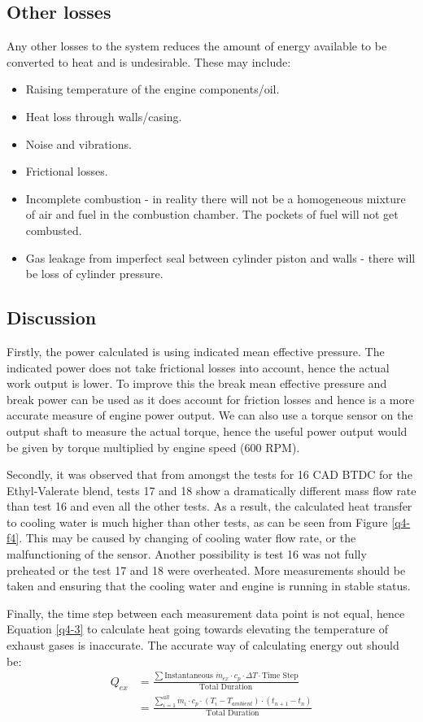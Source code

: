 \documentclass[11pt]{article}
\begin{document}
\subsection*{Other losses}
Any other losses to the system reduces the amount of energy available to be converted to heat and is undesirable. These may include:
\begin{itemize}
	\item Raising temperature of the engine components/oil.
	\item Heat loss through walls/casing.
	\item Noise and vibrations.
	\item Frictional losses. 
	\item Incomplete combustion - in reality there will not be a homogeneous mixture of air and fuel in the combustion chamber. The pockets of fuel will not get combusted.
	\item Gas leakage from imperfect seal between cylinder piston and walls - there will be loss of cylinder pressure.
\end{itemize}
\subsection*{Discussion}
Firstly, the power calculated is using indicated mean effective pressure. The indicated power does not take frictional losses into account, hence the actual work output is lower. To improve this the break mean effective pressure and break power can be used as it does account for friction losses and hence is a more accurate measure of engine power output. We can also use a torque sensor on the output shaft to measure the actual torque, hence the useful power output would be given by torque multiplied by engine speed (600 RPM).

Secondly, it was observed that from amongst the tests for 16 CAD BTDC for the  Ethyl-Valerate blend, tests 17 and 18 show a dramatically different mass flow rate than test 16 and even all the other tests. As a result, the calculated heat transfer to cooling water is much higher than other tests, as can be seen from Figure \ref{q4-f4}. This may be caused by changing of cooling water flow rate, or the malfunctioning of the sensor. Another possibility is test 16 was not fully preheated or the test 17 and 18 were overheated. More measurements should be taken and ensuring that the cooling water and engine is running in stable status.

Finally, the time step between each measurement data point is not equal, hence Equation \ref{q4-3} to calculate heat going towards elevating the temperature of exhaust gases is inaccurate. The accurate way of calculating energy out should be:
\begin{align*}
Q_{ex} &= \frac{\sum \textrm{Instantaneous } \dot{m}_{ex} \cdot c_p \cdot \Delta T \cdot \textrm{Time Step}}{\textrm{Total Duration}} \\
&= \frac{\sum \limits_{i=1}^{all} \dot{m}_{i} \cdot c_p \cdot (T_i-T_{ambient}) \cdot (t_{n+1}-t_n)}{\textrm{Total Duration}}
\end{align*}
\end{document}

